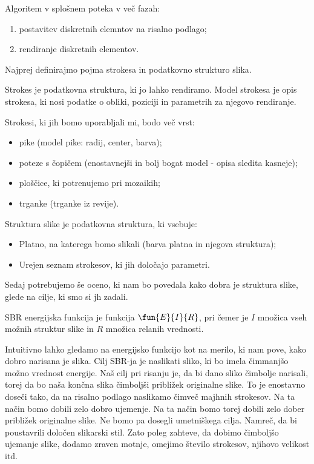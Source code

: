 Algoritem v splošnem poteka v več fazah:
%
\begin{enumerate}
\item postavitev diskretnih elemntov na risalno podlago;
\item rendiranje diskretnih elementov.
\end{enumerate}
%
Najprej definirajmo pojma strokesa in podatkovno strukturo slika.
%
\begin{definicija}
Strokes je podatkovna struktura, ki jo lahko rendiramo. Model strokesa je opis strokesa, ki nosi podatke o obliki, poziciji in parametrih za njegovo rendiranje.
\end{definicija}
% 
Strokesi, ki jih bomo uporabljali mi, bodo več vrst:
%
\begin{itemize}
\item pike (model pike: radij, center, barva);
\item poteze s čopičem (enostavnejši in bolj bogat model - opisa sledita kasneje);
\item ploščice, ki potrenujemo pri mozaikih;
\item trganke (trganke iz revije).
\end{itemize}
%
\begin{definicija}
Struktura slike je podatkovna struktura, ki vsebuje:
\begin{itemize}
\item Platno, na katerega bomo slikali (barva platna in njegova struktura);
\item Urejen seznam strokesov, ki jih določajo parametri.
\end{itemize}
\end{definicija}
%
Sedaj potrebujemo še oceno, ki nam bo povedala kako dobra je struktura slike, glede na cilje, ki smo si jh zadali.
%
\begin{definicija}
SBR energijska funkcija je funkcija $\fun{E}{I}{R}$, pri čemer je $I$ množica vseh možnih struktur slike in $R$ množica relanih vrednosti.
\end{definicija}
%
Intuitivno lahko gledamo na energijsko funkcijo kot na merilo, ki nam pove, kako dobro narisana je slika. Cilj SBR-ja je naslikati sliko, ki bo imela čimmanjšo možno vrednost energije. Naš cilj pri risanju je, da bi dano sliko čimbolje narisali, torej da bo naša končna slika čimboljši približek originalne slike. To je enostavno doseči tako, da na risalno podlago naslikamo čimveč majhnih strokesov. Na ta način bomo dobili zelo dobro ujemenje. Na ta način bomo torej dobili zelo dober približek originalne slike. Ne bomo pa dosegli umetniškega cilja. Namreč, da bi poustavrili določen slikarski stil. Zato poleg zahteve, da dobimo čimboljšo ujemanje slike, dodamo zraven motnje, omejimo število strokesov, njihovo velikost itd.\ 

